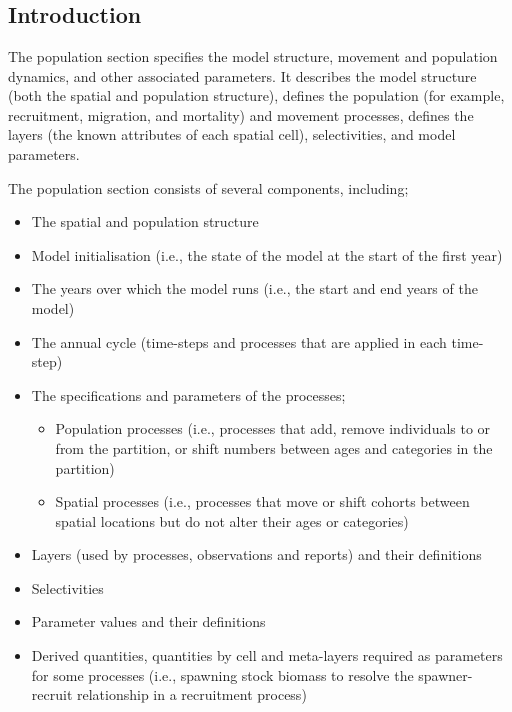 \section{\label{sec:population-section}}

\subsection{Introduction}

The population section specifies the model structure, movement and population dynamics, and other associated parameters. It describes the model structure (both the spatial and population structure), defines the population  (for example, recruitment, migration, and mortality) and movement processes, defines the layers (the known attributes of each spatial cell), selectivities, and model parameters.

The population section consists of several components, including;
\begin{itemize}
  \item The spatial and population structure
  \item Model initialisation (i.e., the state of the model at the start of the first year)
  \item The years over which the model runs (i.e., the start and end years of the model)
  \item The annual cycle (time-steps and processes that are applied in each time-step)
  \item The specifications and parameters of the processes;
  \begin{itemize}
    \item Population processes (i.e., processes that add, remove individuals to or from the partition, or shift numbers between ages and categories in the partition)
    \item Spatial processes (i.e., processes that move or shift cohorts between spatial locations but do not alter their ages or categories)
  \end{itemize}
  \item Layers (used by processes, observations and reports) and their definitions
  \item Selectivities
  \item Parameter values and their definitions
  \item Derived quantities, quantities by cell and meta-layers required as parameters for some processes (i.e., spawning stock biomass to resolve the spawner-recruit relationship in a recruitment process)
\end{itemize}

